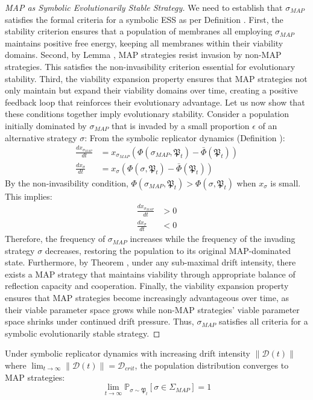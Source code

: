 \begin{proof}[MAP as Symbolic Evolutionarily Stable Strategy]
\label{proof:bk5_map_as_ess}
We need to establish that $\sigma_{MAP}$ satisfies the formal criteria for a symbolic ESS as per Definition .
First, the stability criterion ensures that a population of membranes all employing $\sigma_{MAP}$ maintains positive free energy, keeping all membranes within their viability domains.
Second, by Lemma , MAP strategies resist invasion by non-MAP strategies. This satisfies the non-invasibility criterion essential for evolutionary stability.
Third, the viability expansion property ensures that MAP strategies not only maintain but expand their viability domains over time, creating a positive feedback loop that reinforces their evolutionary advantage.
Let us now show that these conditions together imply evolutionary stability. Consider a population initially dominated by $\sigma_{MAP}$ that is invaded by a small proportion $\epsilon$ of an alternative strategy $\sigma$:
From the symbolic replicator dynamics (Definition ):
\begin{align}
\frac{dx_{\sigma_{MAP}}}{dt} &= x_{\sigma_{MAP}} \left( \Phi(\sigma_{MAP}, \mathfrak{P}_t) - \bar{\Phi}(\mathfrak{P}_t) \right) \\
\frac{dx_\sigma}{dt} &= x_\sigma \left( \Phi(\sigma, \mathfrak{P}_t) - \bar{\Phi}(\mathfrak{P}_t) \right)
\end{align}
By the non-invasibility condition, $\Phi(\sigma_{MAP}, \mathfrak{P}_t) > \Phi(\sigma, \mathfrak{P}_t)$ when $x_\sigma$ is small. This implies:
\begin{align}
\frac{dx_{\sigma_{MAP}}}{dt} &> 0 \\
\frac{dx_\sigma}{dt} &< 0
\end{align}
Therefore, the frequency of $\sigma_{MAP}$ increases while the frequency of the invading strategy $\sigma$ decreases, restoring the population to its original MAP-dominated state.
Furthermore, by Theorem , under any sub-maximal drift intensity, there exists a MAP strategy that maintains viability through appropriate balance of reflection capacity and cooperation.
Finally, the viability expansion property ensures that MAP strategies become increasingly advantageous over time, as their viable parameter space grows while non-MAP strategies' viable parameter space shrinks under continued drift pressure.
Thus, $\sigma_{MAP}$ satisfies all criteria for a symbolic evolutionarily stable strategy.
\end{proof}
\begin{corollary}
\label{corollary:bk5_convergence_to_map}
Under symbolic replicator dynamics with increasing drift intensity $\|\mathcal{D}(t)\|$ where $\lim_{t \to \infty} \|\mathcal{D}(t)\| = \mathcal{D}_{crit}$, the population distribution converges to MAP strategies:
\begin{equation}
\lim_{t \to \infty} \mathbb{P}_{\sigma \sim \mathfrak{P}_t}[\sigma \in \Sigma_{MAP}] = 1
\end{equation}
\end{corollary}
